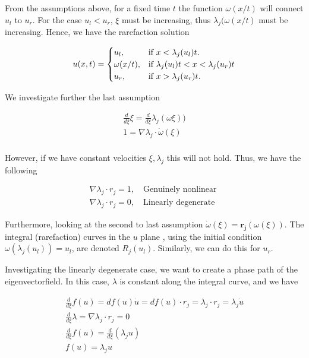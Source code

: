 \documentclass{article}
\numberwithin{equation}{section}
\begin{document}
From the assumptions above, for a fixed time $t$ the function $\omega(x/t)$ will connect $u_l$ to $u_r$. For the case $u_l < u_r$, $\xi$ must be increasing, thus $\lambda_j( \omega(x/t)$ must be increasing. Hence, we have the rarefaction solution 

\begin{equation}
     u(x,t) = \begin{cases} u_l, & \text{if $x < \lambda_j(u_l)t$}.\\
                            \omega(x/t), & \text{if $ \lambda_j(u_l)t$} < x <  \lambda_j(u_r)t\\ 
                            u_r, & \text{if $x >  \lambda_j(u_r)t$}. 
     \end{cases}
     \label{SystemRiemannSol}
 \end{equation}

We investigate further the last assumption

\begin{align*}
    \frac{d}{d\xi} \xi = \frac{d}{d\xi} \lambda_j( \omega \xi)) \\
    1 = \nabla \lambda_j \cdot \dot \omega (\xi) \\
\end{align*}

However, if we have constant velocities $\xi, \lambda_j$ this will not hold. Thus, we have the following

\begin{align}
    \nabla \lambda_j \cdot r_j = 1, \quad \text{Genuinely nonlinear } \\
    \nabla \lambda_j \cdot r_j = 0, \quad \text{Linearly degenerate }
\end{align}

Furthermore, looking at the second to last assumption $\dot \omega( \xi ) = \boldsymbol{r_j}( \omega(\xi))$. The integral (rarefaction) curves in the $u$ plane , using the initial condition $\omega (\lambda_j (u_l)) = u_l$, are denoted $R_j(u_l)$. Similarly, we can do this for $u_r$.

Investigating the linearly degenerate case, we want to create a phase path of the eigenvectorfield. In this case, $\lambda$ is constant along the integral curve, and we have 

\begin{align*}
    \frac{d}{d\xi} f(u) = df(u) \dot u = df(u) \cdot r_j = \lambda_j \cdot r_j = \lambda_j \dot u \\
     \frac{d}{d\xi} \lambda = \nabla \lambda_j \cdot r_j = 0 \\
     \frac{d}{d\xi} f(u) =  \frac{d}{d\xi}( \lambda_j u ) \\
     f(u) = \lambda_j u 
\end{align*}
\end{document}

